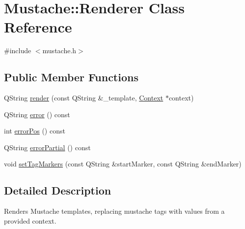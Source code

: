 \hypertarget{classMustache_1_1Renderer}{\section{Mustache\+:\+:Renderer Class Reference}
\label{classMustache_1_1Renderer}
}


{\ttfamily \#include $<$mustache.\+h$>$}

\subsection*{Public Member Functions}
\begin{DoxyCompactItemize}
\item 
Q\+String \hyperlink{classMustache_1_1Renderer_ab82d90fe802606145d1f7ed9f2a9cf81}{render} (const Q\+String \&\+\_\+template, \hyperlink{classMustache_1_1Context}{Context} $\ast$context)
\item 
Q\+String \hyperlink{classMustache_1_1Renderer_aaea1d06b2883b4f52a1117b7d5c5b75a}{error} () const 
\item 
int \hyperlink{classMustache_1_1Renderer_a35aea613ad6426661a715520fa617cb7}{error\+Pos} () const 
\item 
Q\+String \hyperlink{classMustache_1_1Renderer_aa26c1e3e2444cccd926e1d8a4a50fcef}{error\+Partial} () const 
\item 
void \hyperlink{classMustache_1_1Renderer_a4b61e7a727926ca21a812f6649488eb6}{set\+Tag\+Markers} (const Q\+String \&start\+Marker, const Q\+String \&end\+Marker)
\end{DoxyCompactItemize}


\subsection{Detailed Description}
Renders Mustache templates, replacing mustache tags with values from a provided context. 

